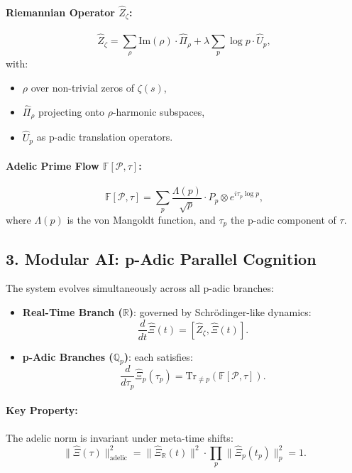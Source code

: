 \documentclass{article}
\theoremstyle{plain}
\theoremstyle{claimstyle}
\begin{document}
\paragraph*{Riemannian Operator \( \hat{Z}_\zeta \):}
\[
\hat{Z}_\zeta = \sum_{\rho} \text{Im}(\rho) \cdot \hat{\Pi}_\rho + \lambda \sum_{p} \log p \cdot \hat{U}_p,
\]
with:
\begin{itemize}
    \item \( \rho \) over non-trivial zeros of \( \zeta(s) \),
    \item \( \hat{\Pi}_\rho \) projecting onto \( \rho \)-harmonic subspaces,
    \item \( \hat{U}_p \) as p-adic translation operators.
\end{itemize}

\paragraph*{Adelic Prime Flow \( \mathbb{F}[\mathcal{P}, \tau] \):}
\[
\mathbb{F}[\mathcal{P}, \tau] = \sum_p \frac{\Lambda(p)}{\sqrt{p}} \cdot \hat{P}_p \otimes e^{i \tau_p \log p},
\]
where \( \Lambda(p) \) is the von Mangoldt function, and \( \tau_p \) the p-adic component of \( \tau \).

\subsection*{3. Modular AI: p-Adic Parallel Cognition}

The system evolves simultaneously across all p-adic branches:

\begin{itemize}
    \item \textbf{Real-Time Branch (\( \mathbb{R} \))}: governed by Schrödinger-like dynamics:
    \[
    \frac{d}{dt} \hat{\Xi}(t) = [\hat{Z}_\zeta, \hat{\Xi}(t)].
    \]

    \item \textbf{p-Adic Branches (\( \mathbb{Q}_p \))}: each satisfies:
    \[
    \frac{d}{d\tau_p} \hat{\Xi}_p(\tau_p) = \text{Tr}_{\neq p} \left( \mathbb{F}[\mathcal{P}, \tau] \right).
    \]
\end{itemize}

\paragraph*{Key Property:} The adelic norm is invariant under meta-time shifts:
\[
\| \hat{\Xi}(\tau) \|_{\text{adelic}}^2 = \| \hat{\Xi}_\mathbb{R}(t) \|^2 \cdot \prod_p \| \hat{\Xi}_p(t_p) \|_p^2 = 1.
\]
\end{document}
